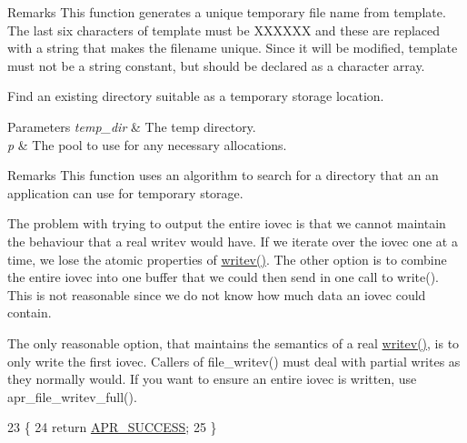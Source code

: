 \begin{DoxyRemark}{Remarks}
This function generates a unique temporary file name from template. The last six characters of template must be X\+X\+X\+X\+XX and these are replaced with a string that makes the filename unique. Since it will be modified, template must not be a string constant, but should be declared as a character array.
\end{DoxyRemark}
Find an existing directory suitable as a temporary storage location. 
\begin{DoxyParams}{Parameters}
{\em temp\+\_\+dir} & The temp directory. \\
\hline
{\em p} & The pool to use for any necessary allocations. \\
\hline
\end{DoxyParams}
\begin{DoxyRemark}{Remarks}
This function uses an algorithm to search for a directory that an an application can use for temporary storage. 
\end{DoxyRemark}
The problem with trying to output the entire iovec is that we cannot maintain the behaviour that a real writev would have. If we iterate over the iovec one at a time, we lose the atomic properties of \hyperlink{apr__arch__os2calls_8h_a3d0f3996136a9b5ab46431c60c746efd}{writev()}. The other option is to combine the entire iovec into one buffer that we could then send in one call to write(). This is not reasonable since we do not know how much data an iovec could contain.

The only reasonable option, that maintains the semantics of a real \hyperlink{apr__arch__os2calls_8h_a3d0f3996136a9b5ab46431c60c746efd}{writev()}, is to only write the first iovec. Callers of file\+\_\+writev() must deal with partial writes as they normally would. If you want to ensure an entire iovec is written, use apr\+\_\+file\+\_\+writev\+\_\+full().
\begin{DoxyCode}
23 \{
24     \textcolor{keywordflow}{return} \hyperlink{group__apr__errno_ga9ee311b7bf1c691dc521d721339ee2a6}{APR\_SUCCESS};
25 \}
\end{DoxyCode}
